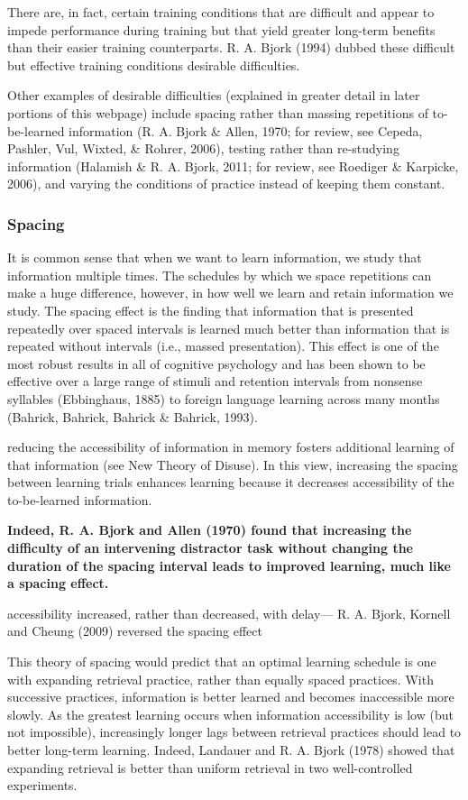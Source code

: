 There are, in fact, certain training conditions that are difficult and appear to impede performance during training but that yield greater long-term benefits than their easier training counterparts. R. A. Bjork (1994) dubbed these difficult but effective training conditions desirable difficulties.

Other examples of desirable difficulties (explained in greater detail in later portions of this webpage) include spacing rather than massing repetitions of to-be-learned information (R. A. Bjork \& Allen, 1970; for review, see Cepeda, Pashler, Vul, Wixted, \& Rohrer, 2006), testing rather than re-studying information (Halamish \& R. A. Bjork, 2011; for review, see Roediger \& Karpicke, 2006), and varying the conditions of practice instead of keeping them constant.

\subsubsection{Spacing}
It is common sense that when we want to learn information, we study that information multiple times. The schedules by which we space repetitions can make a huge difference, however, in how well we learn and retain information we study. The spacing effect is the finding that information that is presented repeatedly over spaced intervals is learned much better than information that is repeated without intervals (i.e., massed presentation). This effect is one of the most robust results in all of cognitive psychology and has been shown to be effective over a large range of stimuli and retention intervals from nonsense syllables (Ebbinghaus, 1885) to foreign language learning across many months (Bahrick, Bahrick, Bahrick \& Bahrick, 1993).

reducing the accessibility of information in memory fosters additional learning of that information (see New Theory of Disuse). In this view, increasing the spacing between learning trials enhances learning because it decreases accessibility of the to-be-learned information.

\textbf{Indeed, R. A. Bjork and Allen (1970) found that increasing the difficulty of an intervening distractor task without changing the duration of the spacing interval leads to improved learning, much like a spacing effect.}

accessibility increased, rather than decreased, with delay— R. A. Bjork, Kornell and Cheung (2009) reversed the spacing effect

This theory of spacing would predict that an optimal learning schedule is one with expanding retrieval practice, rather than equally spaced practices. With successive practices, information is better learned and becomes inaccessible more slowly. As the greatest learning occurs when information accessibility is low (but not impossible), increasingly longer lags between retrieval practices should lead to better long-term learning. Indeed, Landauer and R. A. Bjork (1978) showed that expanding retrieval is better than uniform retrieval in two well-controlled experiments.

